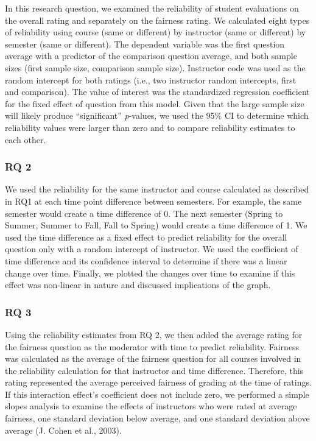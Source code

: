 \documentclass[
  man]{apa7}
\begin{document}
In this research question, we examined the reliability of student
evaluations on the overall rating and separately on the fairness rating.
We calculated eight types of reliability using course (same or
different) by instructor (same or different) by semester (same or
different). The dependent variable was the first question average with a
predictor of the comparison question average, and both sample sizes
(first sample size, comparison sample size). Instructor code was used as
the random intercept for both ratings (i.e., two instructor random
intercepts, first and comparison). The value of interest was the
standardized regression coefficient for the fixed effect of question
from this model. Given that the large sample size will likely produce
``significant'' \emph{p}-values, we used the 95\% CI to determine which
reliability values were larger than zero and to compare reliability
estimates to each other.

\hypertarget{rq-2}{%
\subsubsection{RQ 2}\label{rq-2}}

We used the reliability for the same instructor and course calculated as
described in RQ1 at each time point difference between semesters. For
example, the same semester would create a time difference of 0. The next
semester (Spring to Summer, Summer to Fall, Fall to Spring) would create
a time difference of 1. We used the time difference as a fixed effect to
predict reliability for the overall question only with a random
intercept of instructor. We used the coefficient of time difference and
its confidence interval to determine if there was a linear change over
time. Finally, we plotted the changes over time to examine if this
effect was non-linear in nature and discussed implications of the graph.

\hypertarget{rq-3}{%
\subsubsection{RQ 3}\label{rq-3}}

Using the reliability estimates from RQ 2, we then added the average
rating for the fairness question as the moderator with time to predict
reliability. Fairness was calculated as the average of the fairness
question for all courses involved in the reliability calculation for
that instructor and time difference. Therefore, this rating represented
the average perceived fairness of grading at the time of ratings. If
this interaction effect's coefficient does not include zero, we
performed a simple slopes analysis to examine the effects of instructors
who were rated at average fairness, one standard deviation below
average, and one standard deviation above average (J. Cohen et al., 2003).
\end{document}
